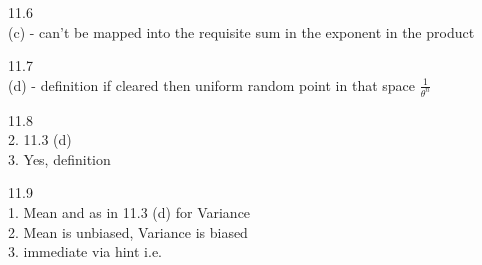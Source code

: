 11.6 \\
(c) - can't be mapped into the requisite sum in the exponent in the product

11.7 \\
(d) - definition if cleared then uniform random point in that space $\frac{1}{\theta^n}$

11.8 \\
2. 11.3 (d) \\
3. Yes, definition

11.9 \\
1. Mean and as in 11.3 (d) for Variance\\
2. Mean is unbiased, Variance is biased\\
3. immediate via hint i.e.